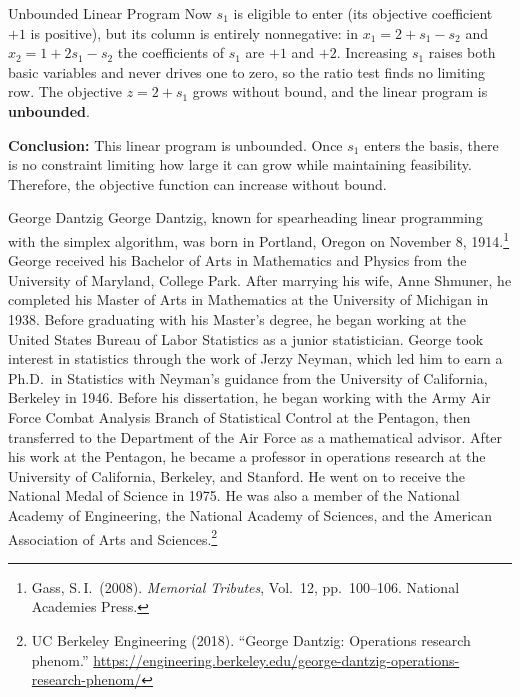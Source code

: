\begin{example}{Unbounded Linear Program}
\noindent Now $s_1$ is eligible to enter (its objective coefficient $+1$ is positive), but its column is entirely nonnegative: in $x_1 = 2 + s_1 - s_2$ and $x_2 = 1 + 2s_1 - s_2$ the coefficients of $s_1$ are $+1$ and $+2$. Increasing $s_1$ raises both basic variables and never drives one to zero, so the ratio test finds no limiting row. The objective $z = 2 + s_1$ grows without bound, and the linear program is \textbf{unbounded}.

\textbf{Conclusion:}  
This linear program is unbounded. Once \( s_1 \) enters the basis, there is no constraint limiting how large it can grow while maintaining feasibility. Therefore, the objective function can increase without bound.
\end{example}

\begin{pioneerspotlight}{George Dantzig}
George Dantzig, known for spearheading linear programming with the simplex algorithm, was born in Portland, Oregon on November 8, 1914.\footnote{Gass, S.\,I.\ (2008). \emph{Memorial Tributes}, Vol.~12, pp.~100--106. National Academies Press.}
George received his Bachelor of Arts in Mathematics and Physics from the University of Maryland, College Park. After marrying his wife, Anne Shmuner, he completed his Master of Arts in Mathematics at the University of Michigan in 1938. Before graduating with his Master's degree, he began working at the United States Bureau of Labor Statistics as a junior statistician. George took interest in statistics through the work of Jerzy Neyman, which led him to earn a Ph.D.\ in Statistics with Neyman's guidance from the University of California, Berkeley in 1946. Before his dissertation, he began working with the Army Air Force Combat Analysis Branch of Statistical Control at the Pentagon, then transferred to the Department of the Air Force as a mathematical advisor. After his work at the Pentagon, he became a professor in operations research at the University of California, Berkeley, and Stanford. He went on to receive the National Medal of Science in 1975. He was also a member of the National Academy of Engineering, the National Academy of Sciences, and the American Association of Arts and Sciences.\footnote{UC Berkeley Engineering (2018). ``George Dantzig: Operations research phenom.'' \url{https://engineering.berkeley.edu/george-dantzig-operations-research-phenom/}}


\end{pioneerspotlight}
